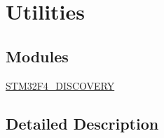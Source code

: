 \hypertarget{group___utilities}{\section{Utilities}
\label{group___utilities}
}
\subsection*{Modules}
\begin{DoxyCompactItemize}
\item 
\hyperlink{group___s_t_m32_f4___d_i_s_c_o_v_e_r_y}{S\-T\-M32\-F4\-\_\-\-D\-I\-S\-C\-O\-V\-E\-R\-Y}
\end{DoxyCompactItemize}


\subsection{Detailed Description}
